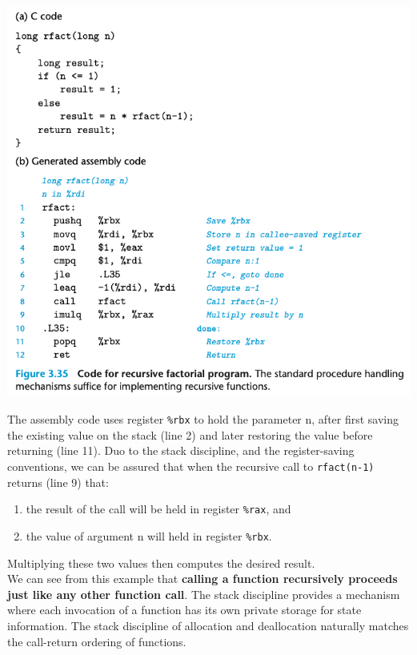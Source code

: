 \documentclass[11pt]{article}
\begin{document}
\begin{center}
\includegraphics[width=.9\linewidth]{pics/code-for-recursive-factorial-program.png}
\end{center}

The assembly code uses register \texttt{\%rbx} to hold the parameter n, after first saving the existing value on the stack (line 2) and later restoring the value before returning (line 11). Duo to the stack discipline, and the register-saving conventions, we can be assured that when the recursive call to \texttt{rfact(n-1)} returns (line 9) that:\\
\begin{enumerate}
\item the result of the call will be held in register \texttt{\%rax}, and\\
\item the value of argument n will held in register \texttt{\%rbx}.\\
\end{enumerate}
Multiplying these two values then computes the desired result.\\

We can see from this example that \textbf{calling a function recursively proceeds just like any other function call}. The stack discipline provides a mechanism where each invocation of a function has its own private storage for state information. The stack discipline of allocation and deallocation naturally matches the call-return ordering of functions.\\
\end{document}
